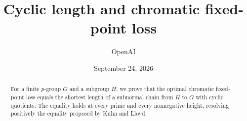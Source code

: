 \documentclass[11pt]{article}
\title{Cyclic length and chromatic fixed-point loss}
\author{OpenAI}
\date{September 24, 2026}
\begin{document}
\maketitle
\begin{abstract}
For a finite \(p\)-group \(G\) and a subgroup \(H\), we prove that the optimal chromatic fixed-point loss equals the shortest length of a subnormal chain from \(H\) to \(G\) with cyclic quotients. The equality holds at every prime and every nonnegative height, resolving positively the equality proposed by Kuhn and Lloyd.
\end{abstract}








\end{document}
